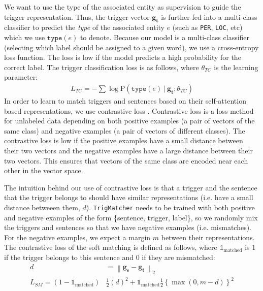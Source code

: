 We want to use the type of the associated entity as supervision to guide the trigger representation.
Thus, the trigger vector $\mathbf{g_t}$ is further fed into a multi-class classifier to predict the \textit{type} of the associated entity $e$ (such as \texttt{PER}, \texttt{LOC}, etc) which we use $\texttt{type}(e)$ to denote. Because our model is a multi-class classifier (selecting which label should be assigned to a given word), we use a cross-entropy loss function.  The loss is low if the model predicts a high probability for the correct label.
The trigger classification loss is as follows, where $\theta_{TC}$ is the learning parameter:
{
	{  
		\begin{align*} 
		L_{TC}=-\sum \log \mathrm{P} \left(\texttt{type}(e)~|~ \mathbf{g_t}; \theta_{TC}\right) 
		\end{align*} 
	}
}  
In order to learn to match triggers and sentences based on their self-attention based representations, we use contrastive loss \citep{hadsell2006dimensionality}. 
Contrastive loss is a loss method for unlabeled data depending on both positive examples (a pair of vectors of the same class) and negative examples (a pair of vectors of different classes). The contrastive loss is low if the positive examples have a small distance between their two vectors and the negative examples have a large distance between their two vectors. This ensures that vectors of the same class are encoded near each other in the vector space.

The intuition behind our use of contrastive loss is that a trigger and the sentence that the trigger belongs to should have similar representations (i.e. have a small distance betweeen them, $d$).
\texttt{TrigMatcher} needs to be trained with both positive and negative examples of the form \{sentence, trigger, label\}, so we randomly mix the triggers and sentences so that we have negative examples (i.e. mismatches). 
For the negative examples, we expect a margin $m$ between their representations. 
The contrastive loss of the soft matching is defined as follows, where $\mathds{1}_{\text{matched}}$ is $1$ if the trigger belongs to this sentence and $0$ if they are mismatched:
{
	{
		\begin{align*}  
		d&=\left\|\mathbf{g_s}-\mathbf{g_t}\right\|_{2}\\
			L_{SM} = (1-\mathds{1}_{\text{matched}}) &\frac{1}{2}\left(d\right)^{2}+\mathds{1}_{\text{matched}} \frac{1}{2}\left\{\max \left(0, m-d\right)\right\}^{2}
		\end{align*} 
	}
}  

